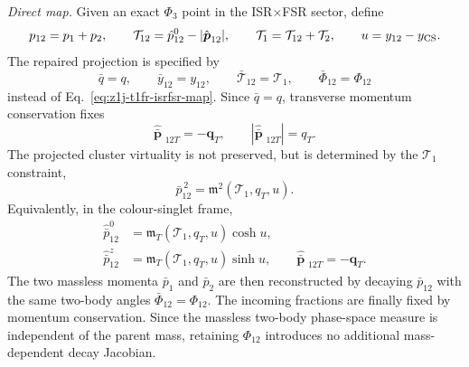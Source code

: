 \documentclass[11pt]{article}
\newcommand{\Ph}{\Phi}
\begin{document}
\medskip
\noindent
\textit{Direct map.}
Given an exact $\Ph_3$ point in the ISR$\times$FSR sector, define
\begin{equation}
p_{12}=p_1+p_2,
\qquad
\mathcal T_{12}=\hat p_{12}^0-|\hat{\boldsymbol p}_{12}|,
\qquad
\mathcal T_1=\mathcal T_{12}+\mathcal T_2,
\qquad
u=y_{12}-y_{\rm CS}.
\label{eq:isrfsr-repair-direct-inputs}
\end{equation}
The repaired projection is specified by
\begin{equation}
\boxed{
\bar q=q,
\qquad
\bar y_{12}=y_{12},
\qquad
\bar{\mathcal T}_{12}=\mathcal T_1,
\qquad
\bar\Phi_{12}=\Phi_{12}
}
\label{eq:isrfsr-repair-direct-map}
\end{equation}
instead of Eq.~\eqref{eq:z1j-t1fr-isrfsr-map}.  Since $\bar q=q$, transverse momentum conservation fixes
\begin{equation}
\hat{\boldsymbol{\bar p}}_{\ \, 12T}=-\boldsymbol q_T,
\qquad
|\hat{\boldsymbol{\bar p}}_{\ \, 12T}|=q_T.
\label{eq:isrfsr-repair-projected-pt}
\end{equation}
The projected cluster virtuality is not preserved, but is determined by the $\mathcal T_1$ constraint,
\begin{equation}
\boxed{
\bar p_{12}^{\,2}
=
\mathfrak m^2(\mathcal T_1,q_T,u)
}.
\label{eq:isrfsr-repair-projected-mass}
\end{equation}
Equivalently, in the colour-singlet frame,
\begin{align}
\hat{\bar p}_{12}^0
&=
\mathfrak m_T(\mathcal T_1,q_T,u)\cosh u,
\nonumber\\
\hat{\bar p}_{12}^z
&=
\mathfrak m_T(\mathcal T_1,q_T,u)\sinh u,
\qquad
\hat{\boldsymbol{\bar p}}_{\ \, 12T}=-\boldsymbol q_T.
\label{eq:isrfsr-repair-projected-components}
\end{align}
The two massless momenta $\bar p_1$ and $\bar p_2$ are then reconstructed by decaying $\bar p_{12}$ with
the same two-body angles $\bar\Phi_{12}=\Phi_{12}$.  The incoming fractions are finally fixed by momentum
conservation.  Since the massless two-body phase-space measure is independent of the parent mass, retaining
$\Phi_{12}$ introduces no additional mass-dependent decay Jacobian.
\end{document}
